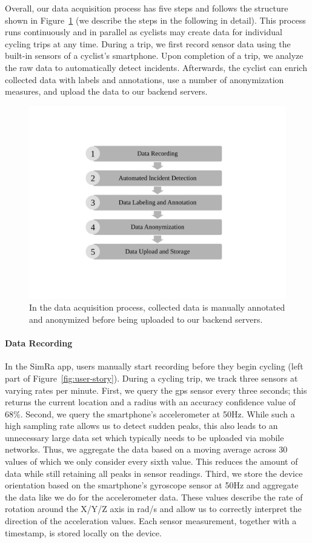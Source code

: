 Overall, our data acquisition process has five steps and follows the structure shown in Figure~\ref{fig:data_acquisition_process} (we describe the steps in the following in detail).
This process runs continuously and in parallel as cyclists may create data for individual cycling trips at any time.
During a trip, we first record sensor data using the built-in sensors of a cyclist's smartphone.
Upon completion of a trip, we analyze the raw data to automatically detect incidents.
Afterwards, the cyclist can enrich collected data with labels and annotations, use a number of anonymization measures, and upload the data to our backend servers.
\begin{figure}
    \center
    \includegraphics[width=0.5\columnwidth]{fig/data_acquisition_process.pdf}
    \caption{In the data acquisition process, collected data is manually annotated and anonymized before being uploaded to our backend servers.}
    \label{fig:data_acquisition_process}
\end{figure}
\paragraph{Data Recording}
In the SimRa app, users manually start recording before they begin cycling (left part of Figure~\ref{fig:user-story}).
During a cycling trip, we track three sensors at varying rates per minute.
First, we query the \ac{gps} sensor every three seconds; this returns the current location and a radius with an accuracy confidence value of 68\%.
Second, we query the smartphone's accelerometer at 50Hz.
While such a high sampling rate allows us to detect sudden peaks, this also leads to an unnecessary large data set which typically needs to be uploaded via mobile networks.
Thus, we aggregate the data based on a moving average across 30 values of which we only consider every sixth value.
This reduces the amount of data while still retaining all peaks in sensor readings.
Third, we store the device orientation based on the smartphone's gyroscope sensor at 50Hz and aggregate the data like we do for the accelerometer data.
These values describe the rate of rotation around the X/Y/Z axis in rad/s and allow us to correctly interpret the direction of the acceleration values.
Each sensor measurement, together with a timestamp, is stored locally on the device.

